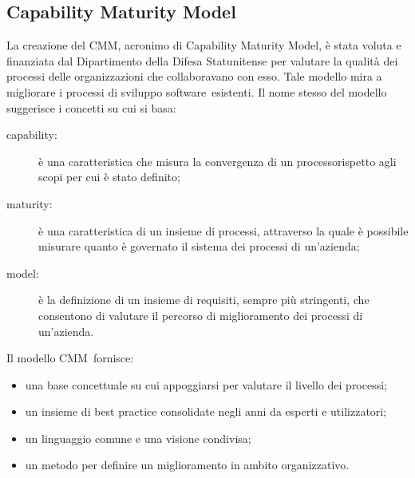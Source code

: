 \documentclass[../PianoDiQualifica.tex]{subfiles}
\begin{document}
\begin{appendices}

\section{Capability Maturity Model}\label{appCMM}
	La creazione del CMM\g, acronimo di Capability Maturity Model, è stata voluta e finanziata dal Dipartimento della Difesa Statunitense per valutare la qualità dei processi delle organizzazioni che collaboravano con esso.    
	Tale modello mira a migliorare i processi di sviluppo software\g\ esistenti. Il nome stesso del modello suggerisce i concetti su cui si basa:
	\begin{description}
		\item[capability:] è una caratteristica che misura la convergenza di un processo\g rispetto agli scopi per cui è stato definito;
		\item[maturity:] è una caratteristica di un insieme di processi, attraverso la quale è possibile misurare quanto è governato il sistema dei processi di un'azienda;
		\item[model:] è la definizione di un insieme di requisiti, sempre più stringenti, che consentono di valutare il percorso di miglioramento dei processi di un'azienda. 
	\end{description}
	Il modello CMM\g\ fornisce:
	\begin{itemize}
		\item una base concettuale su cui appoggiarsi per valutare il livello dei processi;
		\item un insieme di best practice consolidate negli anni da esperti e utilizzatori;
		\item un linguaggio comune e una visione condivisa;
		\item un metodo per definire un miglioramento in ambito organizzativo.
	\end{itemize}

\end{appendices}
\end{document}
